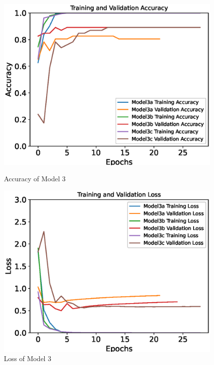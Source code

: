 \begin{figure}[H]
    \centering
    \begin{minipage}{0.49\textwidth}
        \centering
        \includegraphics[width=\textwidth]{./fig/model3/accuracy33.eps}
        \caption{Accuracy of Model 3}
        \label{fig:model33_acc}
    \end{minipage}
    \begin{minipage}{0.49\textwidth}
        \centering
        \includegraphics[width=\textwidth]{./fig/model3/loss33.eps}
        \caption{Loss of Model 3}
        \label{fig:model33_loss}
    \end{minipage}
\end{figure}

